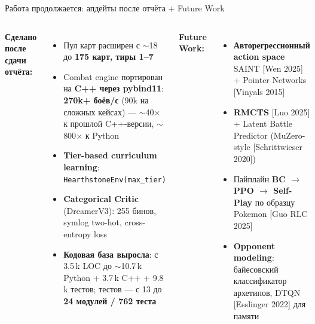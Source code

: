 \documentclass[aspectratio=169,10pt]{beamer}
\newcommand{\cit}[1]{\textcolor{gray!70!black}{\scriptsize[#1]}}
\begin{document}
\begin{frame}{Работа продолжается: апдейты после отчёта + Future Work}
  \begin{columns}[T]
    \textbf{Сделано после сдачи отчёта:}
    \begin{itemize}\small
      \item Пул карт расширен с $\sim$18 до \textbf{175 карт, тиры 1--7}
      \item Combat engine портирован на \textbf{C++ через pybind11}: \textbf{270k+ боёв/с} (90k на сложных кейсах) --- $\sim$40$\times$ к прошлой C++-версии, $\sim$800$\times$ к Python
      \item \textbf{Tier-based curriculum learning}: \texttt{HearthstoneEnv(max\_tier)}
      \item \textbf{Categorical Critic} (DreamerV3): 255 бинов, symlog two-hot, cross-entropy loss
      \item \textbf{Кодовая база выросла}: с 3.5\,k LOC до $\sim$10.7\,k Python + 3.7\,k C++ + 9.8\,k тестов; тестов --- с 13 до \textbf{24 модулей / 762 теста}
    \end{itemize}

    \textbf{Future Work:}
    \begin{itemize}\small
      \item \textbf{Авторегрессионный action space} SAINT \cit{Wen 2025} + Pointer Networks \cit{Vinyals 2015}
      \item \textbf{RMCTS} \cit{Luo 2025} + Latent Battle Predictor (MuZero-style \cit{Schrittwieser 2020})
      \item Пайплайн \textbf{BC $\to$ PPO $\to$ Self-Play} по образцу Pokemon \cit{Guo RLC 2025}
      \item \textbf{Opponent modeling}: байесовский классификатор архетипов, DTQN \cit{Esslinger 2022} для памяти
    \end{itemize}
  \end{columns}
\end{frame}
\end{document}
